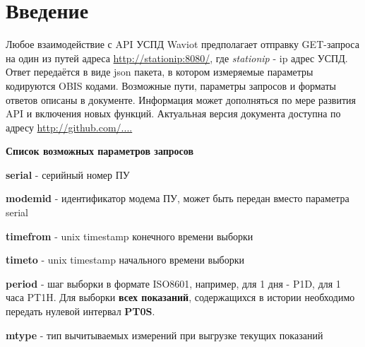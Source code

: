 \section*{Введение}

Любое взаимодействие с API УСПД Waviot предполагает отправку GET-запроса на один из путей адреса \url{http://stationip:8080/}, где \textit{stationip} - ip адрес УСПД. Ответ передаётся в виде json пакета, в котором измеряемые параметры кодируются OBIS кодами. Возможные пути, параметры запросов и форматы ответов описаны в документе. Информация может дополняться по мере развития API и включения новых функций. Актуальная версия документа доступна по адресу \url{http://github.com/....}

\bigskip

\bigskip

\bigskip

\textbf{\Large{Список возможных параметров запросов}}

\bigskip

\textbf{serial} - серийный номер ПУ

\bigskip

\textbf{modemid} - идентификатор модема ПУ, может быть передан вместо параметра serial

\bigskip

\textbf{timefrom} - unix timestamp конечного времени выборки

\bigskip

\textbf{timeto} - unix timestamp начального времени выборки

\bigskip

\textbf{period} - шаг выборки в формате ISO8601, например, для 1 дня - P1D, для 1 часа PT1H. Для выборки \textbf{всех показаний}, содержащихся в истории необходимо передать нулевой интервал \textbf{PT0S}.

\bigskip

\textbf{mtype} - тип вычитываемых измерений при выгрузке текущих показаний